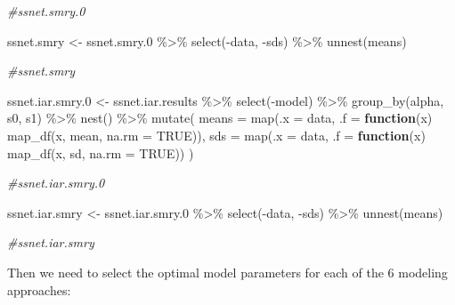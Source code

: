 \documentclass[
]{article}
\newenvironment{Shaded}{\begin{snugshade}}{\end{snugshade}}
\newcommand{\AttributeTok}[1]{\textcolor[rgb]{0.77,0.63,0.00}{#1}}
\newcommand{\CommentTok}[1]{\textcolor[rgb]{0.56,0.35,0.01}{\textit{#1}}}
\newcommand{\ConstantTok}[1]{\textcolor[rgb]{0.00,0.00,0.00}{#1}}
\newcommand{\ControlFlowTok}[1]{\textcolor[rgb]{0.13,0.29,0.53}{\textbf{#1}}}
\newcommand{\FloatTok}[1]{\textcolor[rgb]{0.00,0.00,0.81}{#1}}
\newcommand{\FunctionTok}[1]{\textcolor[rgb]{0.00,0.00,0.00}{#1}}
\newcommand{\NormalTok}[1]{#1}
\newcommand{\OtherTok}[1]{\textcolor[rgb]{0.56,0.35,0.01}{#1}}
\newcommand{\SpecialCharTok}[1]{\textcolor[rgb]{0.00,0.00,0.00}{#1}}
\begin{document}
\begin{Shaded}
\begin{Highlighting}[]
\CommentTok{\#ssnet.smry.0}

\NormalTok{ssnet.smry }\OtherTok{\textless{}{-}}\NormalTok{ ssnet.smry}\FloatTok{.0} \SpecialCharTok{\%\textgreater{}\%}
  \FunctionTok{select}\NormalTok{(}\SpecialCharTok{{-}}\NormalTok{data, }\SpecialCharTok{{-}}\NormalTok{sds) }\SpecialCharTok{\%\textgreater{}\%}
  \FunctionTok{unnest}\NormalTok{(means)}

\CommentTok{\#ssnet.smry}

\NormalTok{ssnet.iar.smry}\FloatTok{.0} \OtherTok{\textless{}{-}}\NormalTok{ ssnet.iar.results }\SpecialCharTok{\%\textgreater{}\%}
  \FunctionTok{select}\NormalTok{(}\SpecialCharTok{{-}}\NormalTok{model) }\SpecialCharTok{\%\textgreater{}\%}
  \FunctionTok{group\_by}\NormalTok{(alpha, s0, s1) }\SpecialCharTok{\%\textgreater{}\%}
  \FunctionTok{nest}\NormalTok{() }\SpecialCharTok{\%\textgreater{}\%}
  \FunctionTok{mutate}\NormalTok{(}
    \AttributeTok{means =} \FunctionTok{map}\NormalTok{(}\AttributeTok{.x =}\NormalTok{ data, }\AttributeTok{.f =} \ControlFlowTok{function}\NormalTok{(x) }\FunctionTok{map\_df}\NormalTok{(x, mean, }\AttributeTok{na.rm =} \ConstantTok{TRUE}\NormalTok{)),}
    \AttributeTok{sds =} \FunctionTok{map}\NormalTok{(}\AttributeTok{.x =}\NormalTok{ data, }\AttributeTok{.f =} \ControlFlowTok{function}\NormalTok{(x) }\FunctionTok{map\_df}\NormalTok{(x, sd, }\AttributeTok{na.rm =} \ConstantTok{TRUE}\NormalTok{))}
\NormalTok{    )}

\CommentTok{\#ssnet.iar.smry.0}

\NormalTok{ssnet.iar.smry }\OtherTok{\textless{}{-}}\NormalTok{ ssnet.iar.smry}\FloatTok{.0} \SpecialCharTok{\%\textgreater{}\%}
  \FunctionTok{select}\NormalTok{(}\SpecialCharTok{{-}}\NormalTok{data, }\SpecialCharTok{{-}}\NormalTok{sds) }\SpecialCharTok{\%\textgreater{}\%}
  \FunctionTok{unnest}\NormalTok{(means)}

\CommentTok{\#ssnet.iar.smry}
\end{Highlighting}
\end{Shaded}

Then we need to select the optimal model parameters for each of the 6
modeling approaches:
\end{document}
